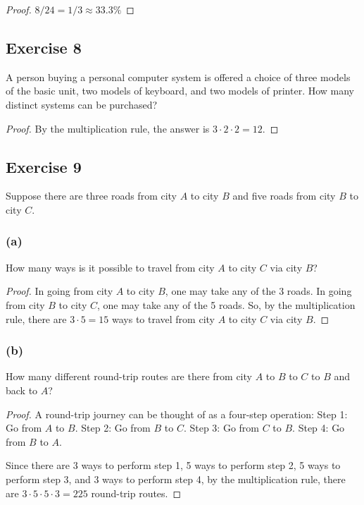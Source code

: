 \documentclass[14pt]{extarticle}
\newcommand{\cy}{\color{cyan}}
\begin{document}
\begin{proof}
     \(8/24 = 1/3 \approx 33.3\%\)
\end{proof}

\subsection{Exercise 8}
A person buying a personal computer system is offered a choice of three models of the basic unit, two models of
keyboard, and two models of printer. How many distinct systems can be purchased?

\begin{proof}
     By the multiplication rule, the answer is \(3 \cdot 2 \cdot 2 = 12\).
\end{proof}

\subsection{Exercise 9}
Suppose there are three roads from city $A$ to city $B$ and five roads from city $B$ to city $C$.

\subsubsection{(a)}
How many ways is it possible to travel from city $A$ to city $C$ via city $B$?

\begin{proof}
     In going from city $A$ to city $B$, one may take any of the 3 roads. In going from city $B$ to city $C$, one may take
     any of the 5 roads. So, by the multiplication rule, there are \(3 \cdot 5 = 15\) ways to travel from city $A$ to city
     $C$ via city $B$.
\end{proof}

\subsubsection{(b)}
How many different round-trip routes are there from city $A$ to $B$ to $C$ to $B$ and back to $A$?

\begin{proof}
     A round-trip journey can be thought of as a four-step operation: {\cy Step 1:} Go from $A$ to $B$. {\cy Step 2:}
     Go from $B$ to $C$. {\cy Step 3:} Go from $C$ to $B$. {\cy Step 4:} Go from $B$ to $A$.

     Since there are 3 ways to perform step 1, 5 ways to perform step 2, 5 ways to perform step 3, and 3 ways to perform
     step 4, by the multiplication rule, there are \(3 \cdot 5 \cdot 5 \cdot 3 = 225\) round-trip routes.
\end{proof}
\end{document}
